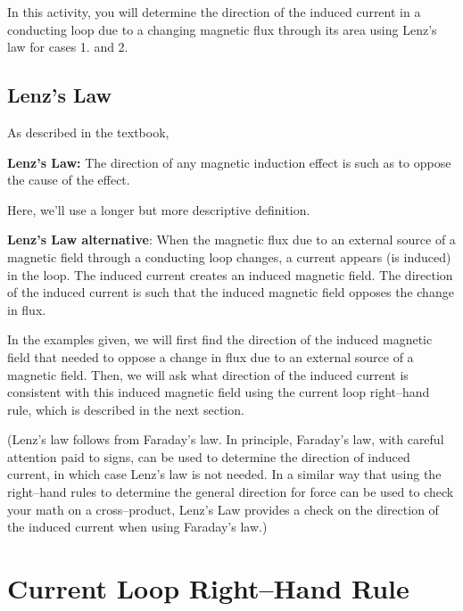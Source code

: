 \documentclass{article}
\begin{document}
In this activity, you will determine the direction of the induced current in a conducting loop due to a changing magnetic flux through its area using Lenz's law for cases 1. and 2.


\newpage

\subsection{Lenz's Law}

As described in the textbook,

{\bf Lenz's Law:} The direction of any magnetic induction effect is such as to oppose the cause of the effect.

Here, we'll use a longer but more descriptive definition.

{\bf Lenz's Law alternative}: When the magnetic flux due to an external source of a magnetic field through a conducting loop changes, a current appears (is induced) in the loop. The induced current creates an induced magnetic field. The direction of the induced current is such that the induced magnetic field opposes the change in flux.

In the examples given, we will first find the direction of the induced magnetic field that needed to oppose a change in flux due to an external source of a magnetic field. Then, we will ask what direction of the induced current is consistent with this induced magnetic field using the current loop right--hand rule, which is described in the next section.

(Lenz's law follows from Faraday's law. In principle, Faraday's law, with careful attention paid to signs, can be used to determine the direction of induced current, in which case Lenz's law is not needed. In a similar way that using the right--hand rules to determine the general direction for force can be used to check your math on a cross--product, Lenz's Law provides a check on the direction of the induced current when using Faraday's law.)

\section{Current Loop Right--Hand Rule}
\end{document}
